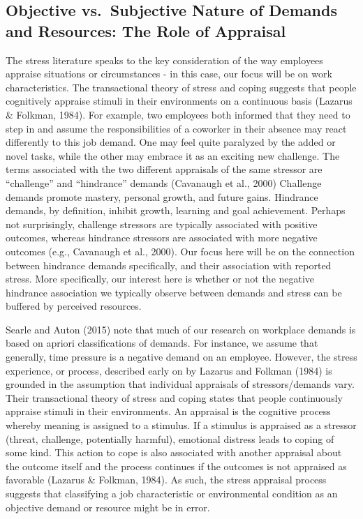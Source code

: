 \documentclass[
  english,
  man]{apa6}
\begin{document}
\hypertarget{objective-vs.-subjective-nature-of-demands-and-resources-the-role-of-appraisal}{%
\subsection{Objective vs.~Subjective Nature of Demands and Resources: The Role of Appraisal}\label{objective-vs.-subjective-nature-of-demands-and-resources-the-role-of-appraisal}}

The stress literature speaks to the key consideration of the way employees appraise situations or circumstances - in this case, our focus will be on work characteristics. The transactional theory of stress and coping suggests that people cognitively appraise stimuli in their environments on a continuous basis (Lazarus \& Folkman, 1984). For example, two employees both informed that they need to step in and assume the responsibilities of a coworker in their absence may react differently to this job demand. One may feel quite paralyzed by the added or novel tasks, while the other may embrace it as an exciting new challenge. The terms associated with the two different appraisals of the same stressor are ``challenge'' and ``hindrance'' demands (Cavanaugh et al., 2000) Challenge demands promote mastery, personal growth, and future gains. Hindrance demands, by definition, inhibit growth, learning and goal achievement. Perhaps not surprisingly, challenge stressors are typically associated with positive outcomes, whereas hindrance stressors are associated with more negative outcomes (e.g., Cavanaugh et al., 2000). Our focus here will be on the connection between hindrance demands specifically, and their association with reported stress. More specifically, our interest here is whether or not the negative hindrance association we typically observe between demands and stress can be buffered by perceived resources.

Searle and Auton (2015) note that much of our research on workplace demands is based on apriori classifications of demands. For instance, we assume that generally, time pressure is a negative demand on an employee. However, the stress experience, or process, described early on by Lazarus and Folkman (1984) is grounded in the assumption that individual appraisals of stressors/demands vary. Their transactional theory of stress and coping states that people continuously appraise stimuli in their environments. An appraisal is the cognitive process whereby meaning is assigned to a stimulus. If a stimulus is appraised as a stressor (threat, challenge, potentially harmful), emotional distress leads to coping of some kind. This action to cope is also associated with another appraisal about the outcome itself and the process continues if the outcomes is not appraised as favorable (Lazarus \& Folkman, 1984). As such, the stress appraisal process suggests that classifying a job characteristic or environmental condition as an objective demand or resource might be in error.
\end{document}
